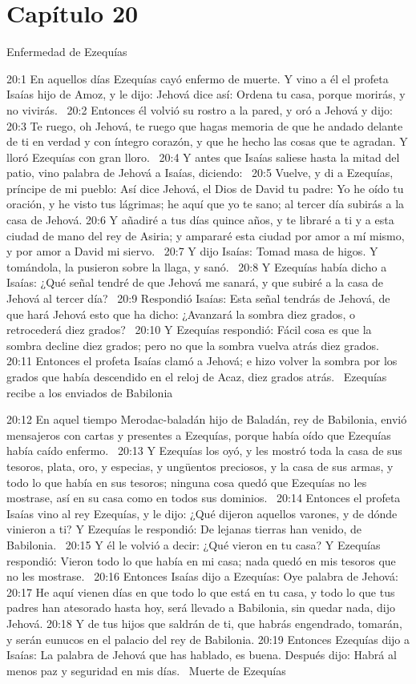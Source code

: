 \section*{Capítulo 20}
Enfermedad de Ezequías  


20:1 En aquellos días Ezequías cayó enfermo de muerte. Y vino a él el profeta Isaías hijo de Amoz, y le dijo: Jehová dice así: Ordena tu casa, porque morirás, y no vivirás.  
20:2 Entonces él volvió su rostro a la pared, y oró a Jehová y dijo:  
20:3 Te ruego, oh Jehová, te ruego que hagas memoria de que he andado delante de ti en verdad y con íntegro corazón, y que he hecho las cosas que te agradan. Y lloró Ezequías con gran lloro.  
20:4 Y antes que Isaías saliese hasta la mitad del patio, vino palabra de Jehová a Isaías, diciendo:  
20:5 Vuelve, y di a Ezequías, príncipe de mi pueblo: Así dice Jehová, el Dios de David tu padre: Yo he oído tu oración, y he visto tus lágrimas; he aquí que yo te sano; al tercer día subirás a la casa de Jehová. 
20:6 Y añadiré a tus días quince años, y te libraré a ti y a esta ciudad de mano del rey de Asiria; y ampararé esta ciudad por amor a mí mismo, y por amor a David mi siervo.  
20:7 Y dijo Isaías: Tomad masa de higos. Y tomándola, la pusieron sobre la llaga, y sanó.  
20:8 Y Ezequías había dicho a Isaías: ¿Qué señal tendré de que Jehová me sanará, y que subiré a la casa de Jehová al tercer día?  
20:9 Respondió Isaías: Esta señal tendrás de Jehová, de que hará Jehová esto que ha dicho: ¿Avanzará la sombra diez grados, o retrocederá diez grados?  
20:10 Y Ezequías respondió: Fácil cosa es que la sombra decline diez grados; pero no que la sombra vuelva atrás diez grados.  
20:11 Entonces el profeta Isaías clamó a Jehová; e hizo volver la sombra por los grados que había descendido en el reloj de Acaz, diez grados atrás.  
Ezequías recibe a los enviados de Babilonia  

20:12 En aquel tiempo Merodac-baladán hijo de Baladán, rey de Babilonia, envió mensajeros con cartas y presentes a Ezequías, porque había oído que Ezequías había caído enfermo.  
20:13 Y Ezequías los oyó, y les mostró toda la casa de sus tesoros, plata, oro, y especias, y ungüentos preciosos, y la casa de sus armas, y todo lo que había en sus tesoros; ninguna cosa quedó que Ezequías no les mostrase, así en su casa como en todos sus dominios.  
20:14 Entonces el profeta Isaías vino al rey Ezequías, y le dijo: ¿Qué dijeron aquellos varones, y de dónde vinieron a ti? Y Ezequías le respondió: De lejanas tierras han venido, de Babilonia.  
20:15 Y él le volvió a decir: ¿Qué vieron en tu casa? Y Ezequías respondió: Vieron todo lo que había en mi casa; nada quedó en mis tesoros que no les mostrase.  
20:16 Entonces Isaías dijo a Ezequías: Oye palabra de Jehová:  
20:17 He aquí vienen días en que todo lo que está en tu casa, y todo lo que tus padres han atesorado hasta hoy, será llevado a Babilonia, sin quedar nada, dijo Jehová. 
20:18 Y de tus hijos que saldrán de ti, que habrás engendrado, tomarán, y serán eunucos en el palacio del rey de Babilonia. 
20:19 Entonces Ezequías dijo a Isaías: La palabra de Jehová que has hablado, es buena. Después dijo: Habrá al menos paz y seguridad en mis días.  
Muerte de Ezequías  

